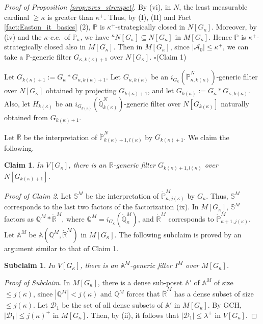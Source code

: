 \documentclass[a4paper,12pt,reqno,oneside]{amsart}
\theoremstyle{plain}
\newtheorem{claim}{Claim}
\newtheorem*{subclaim*}{Subclaim}
\newcommand{\mbb}{\mathbb}
\newcommand{\mcal}{\mathcal}
\begin{document}
\begin{proof}[Proof of Proposition \ref{prop:pres_strcmpct}]
By (vi), in $N$, the least measurable cardinal $\geq \kappa$ is greater than $\kappa^+$. Thus, by (I), (II) and Fact \ref{fact:Easton_it_basics} (2), $\mbb{P}$ is $\kappa^+$-strategically closed in $N[ G_\kappa ]$. Moreover, by (iv) and the $\kappa$-c.c.~of $\mbb{P}_\kappa$, we have  ${}^\kappa N[ G_\kappa ] \subseteq N[ G_\kappa ]$ in $M[ G_\kappa ]$. Hence $\mbb{P}$ is $\kappa^+$-strategically closed also in $M[ G_\kappa ]$. Then in $M[ G_\kappa ]$, since $| \mcal{A}_0 | \leq \kappa^+$, we can take a $\mbb{P}$-generic filter $G_{\kappa , k( \kappa ) + 1}$ over $N[ G_\kappa ]$.
\hfill $\square$(Claim 1)

\medskip
Let $G_{k( \kappa ) + 1} := G_\kappa * G_{\kappa , k( \kappa ) + 1}$. Let $G_{\kappa , k( \kappa )}$ be an $i_{G_\kappa} ( \dot{\mbb{P}}_{\kappa , k( \kappa )}^N )$-generic filter over $N[ G_\kappa ]$ obtained by projecting $G_{k( \kappa ) + 1}$, and let $G_{k( \kappa )} := G_\kappa * G_{\kappa , k( \kappa )}$. Also, let $H_{k( \kappa )}$ be an $i_{G_{k( \kappa )}} ( \dot{\mbb{Q}}_{k( \kappa )}^N )$-generic filter over $N[ G_{k( \kappa )} ]$ naturally obtained from $G_{k( \kappa ) + 1}$.


Let $\mbb{R}$ be the interpretation of $\dot{\mbb{P}}_{k( \kappa ) + 1 , l( \kappa )}^N$ by $G_{k( \kappa ) + 1}$. We claim the following.

\begin{claim}
In $V[ G_\kappa ]$, there is an $\mbb{R}$-generic filter $G_{k( \kappa ) + 1 , l( \kappa )}$ over $N[ G_{k( \kappa ) + 1} ]$.
\end{claim}


\noindent
\emph{Proof of Claim 2}. Let $\mbb{S}^M$ be the interpretation of $\dot{\mbb{P}}_{\kappa , j( \kappa )}^M$ by $G_\kappa$. Thus, $\mbb{S}^M$ corresponds to the last two factors of the factorization (ix). In $M[ G_\kappa ]$, $\mbb{S}^M$ factors as $\mbb{Q}^M * \dot{\mbb{R}}^M$, where $\mbb{Q}^M = i_{G_\kappa} ( \dot{\mbb{Q}}_\kappa^M )$, and $\dot{\mbb{R}}^M$ corresponds to $\dot{\mbb{P}}_{\kappa + 1 , j( \kappa )}^M$. Let $\mbb{A}^M$ be $\mbb{A} ( \mbb{Q}^M , \dot{\mbb{R}}^M )$ in $M[ G_\kappa ]$. The following subclaim is proved by an argument similar to that of Claim 1.

\begin{subclaim*}
In $V[ G_\kappa ]$, there is an $\mbb{A}^M$-generic filter $I^M$ over $M[ G_\kappa ]$.
\end{subclaim*}

\noindent
\emph{Proof of Subclaim}.
In $M[ G_\kappa ]$, there is a dense sub-poset $\mbb{A}'$ of $\mbb{A}^M$ of size $\leq j( \kappa )$, since $| \mbb{Q}^M | < j( \kappa )$ and $\mbb{Q}^M$ forces that $\dot{\mbb{R}}^M$ has a dense subset of size $\leq j( \kappa )$. Let $\mcal{D}_1$ be the set of all dense subsets of $\mbb{A}'$ in $M[ G_\kappa ]$. By GCH, $| \mcal{D}_1 | \leq j( \kappa )^+$ in $M[ G_\kappa ]$. Then, by (ii), it follows that  $| \mcal{D}_1 | \leq \lambda^+$ in $V[ G_\kappa ]$.


\end{proof}
\end{document}
